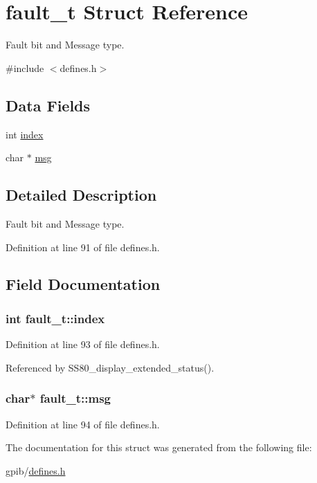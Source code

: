 \hypertarget{structfault__t}{}\section{fault\+\_\+t Struct Reference}
\label{structfault__t}


Fault bit and Message type.  




{\ttfamily \#include $<$defines.\+h$>$}

\subsection*{Data Fields}
\begin{DoxyCompactItemize}
\item 
int \hyperlink{structfault__t_a540c9496df912b65e22c50b6a40535ef}{index}
\item 
char $\ast$ \hyperlink{structfault__t_a9037306efc26edf60b59bc1ee6843c69}{msg}
\end{DoxyCompactItemize}


\subsection{Detailed Description}
Fault bit and Message type. 

Definition at line 91 of file defines.\+h.



\subsection{Field Documentation}
\subsubsection[{\texorpdfstring{index}{index}}]{\setlength{\rightskip}{0pt plus 5cm}int fault\+\_\+t\+::index}\hypertarget{structfault__t_a540c9496df912b65e22c50b6a40535ef}{}\label{structfault__t_a540c9496df912b65e22c50b6a40535ef}


Definition at line 93 of file defines.\+h.



Referenced by S\+S80\+\_\+display\+\_\+extended\+\_\+status().

\subsubsection[{\texorpdfstring{msg}{msg}}]{\setlength{\rightskip}{0pt plus 5cm}char$\ast$ fault\+\_\+t\+::msg}\hypertarget{structfault__t_a9037306efc26edf60b59bc1ee6843c69}{}\label{structfault__t_a9037306efc26edf60b59bc1ee6843c69}


Definition at line 94 of file defines.\+h.



The documentation for this struct was generated from the following file\+:\begin{DoxyCompactItemize}
\item 
gpib/\hyperlink{defines_8h}{defines.\+h}\end{DoxyCompactItemize}
